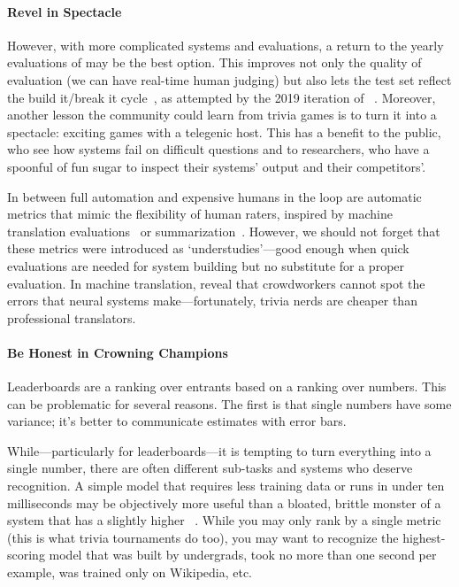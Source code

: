 \paragraph{Revel in Spectacle}

However, with more complicated systems and evaluations, a return to the yearly evaluations of  may be the best option.
This improves not only the quality of evaluation (we can have real-time human judging) but also lets the test set reflect the build it/break it cycle~\cite{ruef-16}, as attempted by the 2019 iteration of ~\cite{thorne-19}.
Moreover, another lesson the  community could learn from
trivia games is to turn it into a spectacle: exciting games with a
telegenic host.
This has a benefit to the public, who see how  systems fail on difficult questions and to  researchers, who have a spoonful of fun sugar to inspect their systems' output and their competitors'.

In between full automation and expensive humans in the loop are automatic metrics that mimic the flexibility of human raters, inspired by machine translation evaluations~\cite{papineni-02,specia-10} or summarization~\cite{lin-04}. 
However, we should not forget
that these metrics were introduced as `understudies'---good enough when quick evaluations are needed for system
building but no substitute for a proper evaluation.
In machine translation,  reveal that crowdworkers cannot spot the errors that neural  systems make---fortunately, trivia nerds are cheaper than professional translators.

\paragraph{Be Honest in Crowning  Champions}

Leaderboards are a ranking over entrants based on a ranking over numbers.
This can be problematic for several reasons.
The first is that single numbers have some variance; it's better to communicate estimates with error bars.

While---particularly for leaderboards---it is tempting to turn everything into a single number, there are often different sub-tasks and systems who deserve recognition.
A simple model that requires less training data or runs in under ten milliseconds may be objectively more useful than a bloated, brittle monster of a system that has a slightly higher \fone{}~\cite{dodge-19}. 
While you may only rank by a single metric (this is what trivia tournaments do too), you may want to recognize the highest-scoring model that was built by undergrads, took no more than one second per example, was trained only on Wikipedia, etc.

